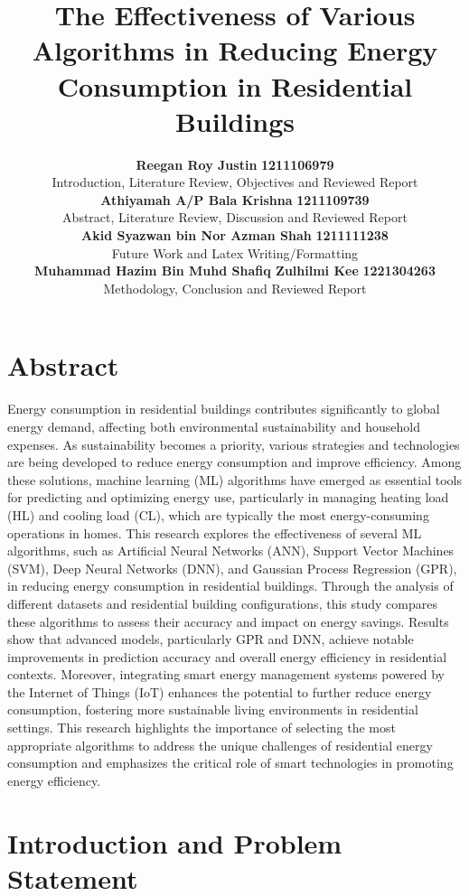 \documentclass[a4paper, 12pt]{article}
\author{
\textbf{Reegan Roy Justin} \quad \textbf{1211106979} \\ Introduction, Literature Review,  Objectives and Reviewed Report \vspace{7pt} \\
\textbf{Athiyamah A/P Bala Krishna} \quad \textbf{1211109739} \\ Abstract, Literature Review, Discussion and Reviewed Report \vspace{7pt} \\
\textbf{Akid Syazwan bin Nor Azman Shah} \quad \textbf{1211111238} \\ Future Work and Latex Writing/Formatting \vspace{7pt} \\
\textbf{Muhammad Hazim Bin Muhd Shafiq Zulhilmi Kee} \quad \textbf{1221304263} \\ Methodology, Conclusion and Reviewed Report \vspace{7pt}
}
\title{ \textbf{The Effectiveness of Various Algorithms in Reducing Energy Consumption in Residential Buildings} }
\begin{document}
\maketitle

\newpage
\renewcommand{\contentsname}{Contents} 
\tableofcontents
\newpage

\section{Abstract}
\quad Energy consumption in residential buildings contributes significantly to global energy demand, affecting both environmental sustainability and household expenses. As sustainability becomes a priority, various strategies and technologies are being developed to reduce energy consumption and improve efficiency. Among these solutions, machine learning (ML) algorithms have emerged as essential tools for predicting and optimizing energy use, particularly in managing heating load (HL) and cooling load (CL), which are typically the most energy-consuming operations in homes. This research explores the effectiveness of several ML algorithms, such as Artificial Neural Networks (ANN), Support Vector Machines (SVM), Deep Neural Networks (DNN), and Gaussian Process Regression (GPR), in reducing energy consumption in residential buildings. Through the analysis of different datasets and residential building configurations, this study compares these algorithms to assess their accuracy and impact on energy savings. Results show that advanced models, particularly GPR and DNN, achieve notable improvements in prediction accuracy and overall energy efficiency in residential contexts. Moreover, integrating smart energy management systems powered by the Internet of  Things (IoT) enhances the potential to further reduce energy consumption, fostering more sustainable living environments in residential settings. This research highlights the importance of selecting the most appropriate algorithms to address the unique challenges of residential energy consumption and emphasizes the critical role of smart technologies in promoting energy efficiency.
\vspace{7pt}

\section{Introduction and Problem Statement}
\end{document}
